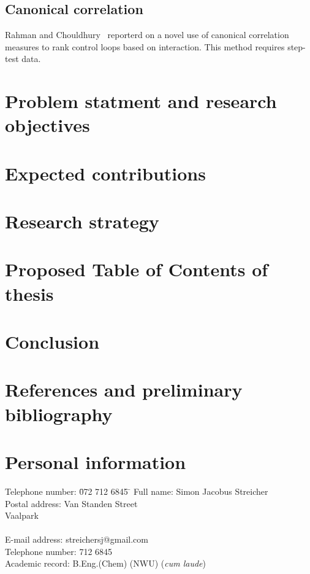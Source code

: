\documentclass[a4paper]{book}
\begin{document}
\section{Canonical correlation}

Rahman and Chouldhury~\cite{Rahman2011} reporterd on a novel use of canonical correlation measures to rank control loops based on interaction.
This method requires step-test data.












\chapter{Problem statment and research objectives}

\chapter{Expected contributions}

\chapter{Research strategy}

\chapter{Proposed Table of Contents of thesis}

\chapter{Conclusion}

\backmatter
\chapter{References and preliminary bibliography}




\chapter{Personal information}

\begin{tabbing}
  Telephone number: \= 072 712 6845 \= \kill
  Full name: \> Simon Jacobus Streicher \\[2ex]
  Postal address:  Van Standen Street \\ \> Vaalpark \\  \\[2ex] 
  E-mail address: \> streichersj@gmail.com \\[2ex]
  Telephone number:  712 6845 \\[2ex]
  Academic record: \> B.Eng.(Chem) (NWU) (\textit{cum laude})
\end{tabbing}
\end{document}
